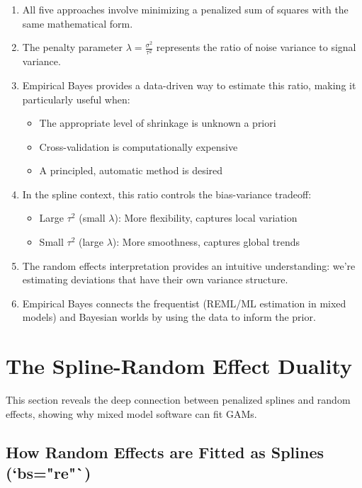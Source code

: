\documentclass[12pt]{article}
\begin{document}
\begin{enumerate}
    \item All five approaches involve minimizing a penalized sum of squares with the same mathematical form.
    \item The penalty parameter $\lambda = \frac{\sigma^2}{\tau^2}$ represents the ratio of noise variance to signal variance.
    \item Empirical Bayes provides a data-driven way to estimate this ratio, making it particularly useful when:
    \begin{itemize}
        \item The appropriate level of shrinkage is unknown a priori
        \item Cross-validation is computationally expensive
        \item A principled, automatic method is desired
    \end{itemize}
    \item In the spline context, this ratio controls the bias-variance tradeoff:
    \begin{itemize}
        \item Large $\tau^2$ (small $\lambda$): More flexibility, captures local variation
        \item Small $\tau^2$ (large $\lambda$): More smoothness, captures global trends
    \end{itemize}
    \item The random effects interpretation provides an intuitive understanding: we're estimating deviations that have their own variance structure.
    \item Empirical Bayes connects the frequentist (REML/ML estimation in mixed models) and Bayesian worlds by using the data to inform the prior.
\end{enumerate}



\section{The Spline-Random Effect Duality}

This section reveals the deep connection between penalized splines and random effects, showing why mixed model software can fit GAMs.

\subsection{How Random Effects are Fitted as Splines (`bs="re"`)}
\end{document}
